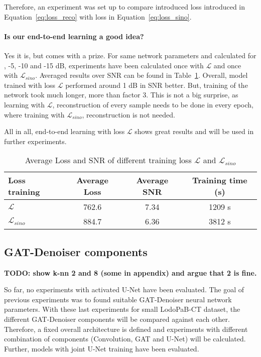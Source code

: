Therefore, an experiment was set up to compare introduced loss introduced in Equation~\ref{eq:loss_reco}
with loss in Equation~\ref{eq:loss_sino}.


\paragraph{Is our end-to-end learning a good idea?}
Yes it is, but comes with a prize. 
For same network parameters and calculated for , -5, -10 and -15 dB,
experiments have been calculated once with $\mathcal{L} $ and once with $\mathcal{L}_{sino}$.
Averaged results over SNR can be found in Table~\ref{tab:loss_sino_reco}. 
Overall, model trained with loss $\mathcal{L} $ performed around 1 dB in SNR better.
But, training of the network took much longer, more than factor 3. 
This is not a big surprise, as learning with $\mathcal{L} $, reconstruction of every sample
needs to be done in every epoch, where training with $\mathcal{L}_{sino}$, reconstruction is not needed.

All in all, end-to-end learning with loss $\mathcal{L} $ shows great results and will be used in further experiments.

\begin{table}[H]
  \centering
    \begin{tabular}{l|ccc}
    \toprule
    \textbf{Loss training} & \textbf{Average Loss} & \textbf{Average SNR} & \textbf{Training time (s)}  \\ 
    \midrule
    $\mathcal{L} $         &  762.6    &  7.34  & 1209 s \\ \hline
    $\mathcal{L}_{sino}$   &  884.7    &  6.36  & 3812 s \\ \hline
    \midrule
    \end{tabular}
  \caption{Average Loss and SNR of different training loss $\mathcal{L}$ and $\mathcal{L}_{sino}$}
  \label{tab:loss_sino_reco}
\end{table}


\subsection{GAT-Denoiser components}

\textbf{TODO: show k-nn 2 and 8 (some in appendix) and argue that 2 is fine.}

So far, no experiments with activated U-Net have been evaluated. 
The goal of previous experiments was to found suitable GAT-Denoiser neural network parameters.
With these last experiments for small LodoPaB-CT dataset, the different 
GAT-Denoiser components will be compared against each other.
Therefore, a fixed overall architecture is defined and experiments
with different combination of components (Convolution, GAT and U-Net) will be calculated.
Further, models with joint U-Net training have been evaluated.

